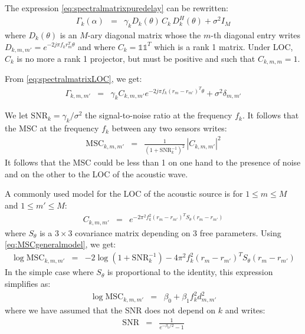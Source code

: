 \documentclass[a4paper, 12pt]{report}
\newcommand{\diag}[1]{\mathrm{diag}\left( #1 \right)}
\def\SNR{\mathrm{SNR}}
\def\MSC{\mathrm{MSC}}
\begin{document}
The expression \eqref{eq:spectralmatrixpuredelay} can be rewritten:
\begin{eqnarray}
\label{eq:spectralmatrixLOC}
\Gamma_{k}(\alpha)&=&\gamma_{k}D_{k}(\theta)\, C_{k}\,D_{k}^{H}(\theta)+\sigma^{2}I_{M}
\end{eqnarray}
where $D_{k}(\theta)$ is an $M$-ary diagonal matrix whose the $m$-th diagonal entry writes $D_{k,m,m'}=e^{-2j\pi f_{k} r_{m}^{T}\theta }$ and where $C_{k}=\mathds{1}\mathds{1}^{T}$ which is a rank 1 matrix. Under LOC, $C_{k}$ is no more a rank 1 projector,  but must be positive and such that $C_{k,m,m}=1$.

From \eqref{eq:spectralmatrixLOC}, we get:
\begin{eqnarray*}
 \Gamma_{k,m,m'}&=& \gamma_{k}C_{k,m,m'}e^{-2j\pi f_{k} (r_{m}-r_{m'})^{T}\theta }+\sigma^{2}\delta_{m,m'}
\end{eqnarray*}


We let $\SNR_{k}=\gamma_{k}/\sigma^2$ the signal-to-noise ratio at the frequency $f_{k}$. It follows that the MSC at the frequency $f_{k}$  between any two sensors writes:
\begin{eqnarray}
\label{eq:MSCgeneralmodel}
 \MSC_{k,m,m'}&=& \frac{1}{(1+\SNR_{k}^{-1})^2}\,|C_{k,m,m'}|^{2}
\end{eqnarray}
It follows that the MSC could be less than 1 on one hand to the presence of noise and on the other to the LOC of the acoustic wave.


A commonly used model for the LOC of the acoustic source is for $1\leq m\leq M$ and $1\leq m'\leq M$:
\begin{eqnarray}
 \label{eq:CkwithGauss}
 C_{k,m,m'} &=&e^{-2\pi^2f_k^2(r_{m}-r_{m'})^TS_{\theta}(r_{m}-r_{m'})}
\end{eqnarray}
where $S_{\theta}$ is a $3\times 3$ covariance matrix depending on 3 free parameters. Using \eqref{eq:MSCgeneralmodel}, we get:
\begin{eqnarray*}
\label{eq:MSCgaussianmodel}
 \log \MSC_{k,m,m'}&=& -2 \log(1+\SNR_{k}^{-1})
-4\pi^2f_k^2(r_{m}-r_{m'})^TS_{\theta}(r_{m}-r_{m'})
\end{eqnarray*}
In the simple case where $S_{\theta}$ is proportional to the identity, this expression simplifies as:
\begin{eqnarray}
\label{eq:logMSCgaussianmodel}
 \log \MSC_{k,m,m'}&=& \beta_{0}+\beta_{1} f_k^2 d_{m,m'}^2
\end{eqnarray}
where we have assumed that the SNR does not depend on $k$ and writes:
\begin{eqnarray*}
 \SNR&=&\frac{1}{e^{- \beta_{0}/2}-1}
\end{eqnarray*}
\end{document}
